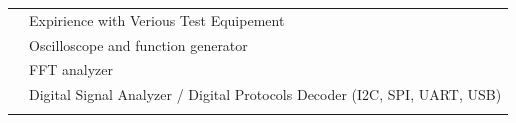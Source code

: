 \documentclass[lighthipster]{simplehipstercv}
\begin{document}
\begin{paracol}{2}
\begin{minipage}[t]{0.60\textwidth}
\begin{tabular}{l @{}l}
		\\[1mm]


		\icon{\faSquare}{Blue}{}
		& \hspace{1mm} Expirience with Verious Test Equipement \\[1mm]

		\phantom{x}\tiny\phantom{xx}\faCircle
		& \hspace{2mm} Oscilloscope and function generator \\[1mm]

		\phantom{x}\tiny\phantom{xx}\faCircle
		& \hspace{2mm} FFT analyzer \\[1mm]

		\phantom{x}\tiny\phantom{xx}\faCircle
		& \hspace{2mm} Digital Signal Analyzer / Digital 
						Protocols Decoder (I2C, SPI, UART, USB) \\[1mm]

		\\[1mm]

	\end{tabular}
\end{minipage}
\end{paracol}
\end{document}
